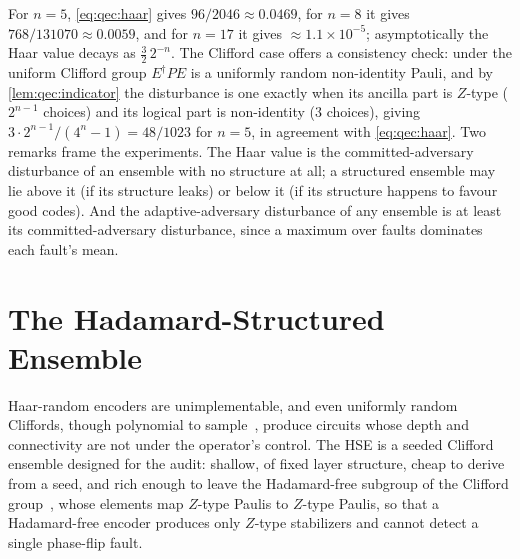 For $n=5$, \cref{eq:qec:haar} gives $96/2046\approx 0.0469$, for $n=8$ it gives $768/131070\approx 0.0059$, and for $n=17$ it gives $\approx 1.1\times 10^{-5}$; asymptotically the Haar value decays as $\tfrac{3}{2}\,2^{-n}$. The Clifford case offers a consistency check: under the uniform Clifford group $E^{\dagger}PE$ is a uniformly random non-identity Pauli, and by \cref{lem:qec:indicator} the disturbance is one exactly when its ancilla part is $Z$-type ($2^{n-1}$ choices) and its logical part is non-identity ($3$ choices), giving $3\cdot 2^{n-1}/(4^{n}-1)=48/1023$ for $n=5$, in agreement with \cref{eq:qec:haar}. Two remarks frame the experiments. The Haar value is the committed-adversary disturbance of an ensemble with no structure at all; a structured ensemble may lie above it (if its structure leaks) or below it (if its structure happens to favour good codes). And the adaptive-adversary disturbance of any ensemble is at least its committed-adversary disturbance, since a maximum over faults dominates each fault's mean.

\section{The Hadamard-Structured Ensemble}\label{sec:qec:hse}

Haar-random encoders are unimplementable, and even uniformly random Cliffords, though polynomial to sample~\cite{koenig2014clifford}, produce circuits whose depth and connectivity are not under the operator's control. The HSE is a seeded Clifford ensemble designed for the audit: shallow, of fixed layer structure, cheap to derive from a seed, and rich enough to leave the Hadamard-free subgroup of the Clifford group~\cite{bravyi2021hadamardfree}, whose elements map $Z$-type Paulis to $Z$-type Paulis, so that a Hadamard-free encoder produces only $Z$-type stabilizers and cannot detect a single phase-flip fault.

